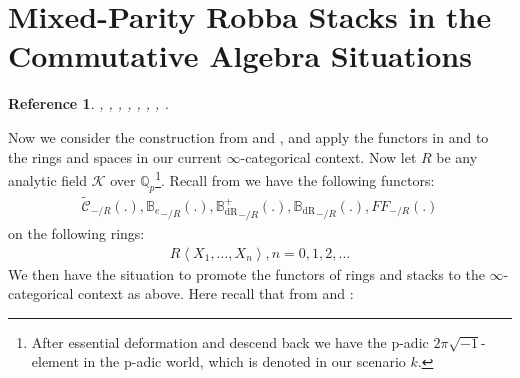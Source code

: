 \documentclass[12pt]{book}
\newtheorem{reference}{Reference}
\begin{document}
\newpage
\section{Mixed-Parity Robba Stacks in the Commutative Algebra Situations}

\begin{reference}
\cite{KL1}, \cite{KL2}, \cite{Sch1}, \cite{Sch}, \cite{Fon}, \cite{FF}, \cite{F1}, \cite{Ta}.
\end{reference}




Now we consider the construction from \cite{KL1} and \cite{KL2}, and apply the functors in \cite[Definition 9.3.3, Definition 9.3.5, Definition 9.3.11, Definition 9.3.9]{KL1} and \cite{KL2} to the rings and spaces in our current $\infty$-categorical context. Now let $R$ be any analytic field $\mathcal{K}$ over $\mathbb{Q}_p$\footnote{After essential deformation and descend back we have the p-adic $2\pi\sqrt{-1}$-element in the p-adic world, which is denoted in our scenario $k$.}. Recall from \cite[Definition 9.3.3, Definition 9.3.5, Definition 9.3.11, Definition 9.3.9]{KL1} we have the following functors:
\begin{align}
\widetilde{\mathcal{C}}_{-/R}(.),{\mathbb{B}_e}_{-/R}(.),{\mathbb{B}_\mathrm{dR}^+}_{-/R}(.),{\mathbb{B}_\mathrm{dR}}_{-/R}(.),{FF}_{-/R}(.)	
\end{align}
on the following rings:
\begin{align}
R\left<X_1,...,X_n\right>,n=0,1,2,...	
\end{align}
We then have the situation to promote the functors of rings and stacks to the $\infty$-categorical context as above. Here recall that from \cite[Definition 9.3.3, Definition 9.3.5, Definition 9.3.11, Definition 9.3.9]{KL1} and \cite{KL2}:
\end{document}
